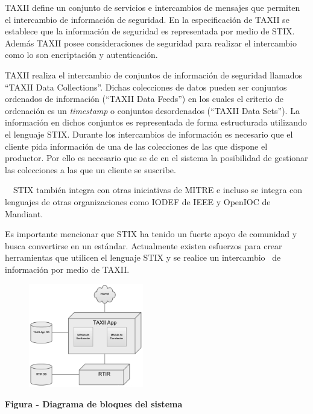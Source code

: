 {
	TAXII define un conjunto de servicios e intercambios de mensajes que permiten el intercambio de información de
	seguridad. En la especificación de TAXII se establece que la información de seguridad es representada por medio de
	STIX. Además TAXII posee consideraciones de seguridad para realizar el intercambio como lo son encriptación y
	autenticación. }


\bigskip

{
	TAXII realiza el intercambio de conjuntos de información de seguridad llamados ``TAXII Data Collections''. Dichas
	colecciones de datos pueden ser conjuntos ordenados de información (``TAXII Data Feeds'') en los cuales el criterio de
	ordenación es un \textit{timestamp} o conjuntos desordenados (``TAXII Data Sets''). La información en dichos conjuntos
	es representada de forma estructurada utilizando el lenguaje STIX. Durante los intercambios de información es necesario
	que el cliente pida información de una de las colecciones de las que dispone el productor. Por ello es necesario que se
	de en el sistema la posibilidad de gestionar las colecciones a las que un cliente se suscribe.}


\bigskip

{
	\ \ STIX también integra con otras iniciativas de MITRE e incluso se integra con lenguajes de otras organizaciones como
	IODEF de IEEE y OpenIOC de Mandiant. }


\bigskip

{
	Es importante mencionar que STIX ha tenido un fuerte apoyo de comunidad y busca convertirse en un estándar. Actualmente
	existen esfuerzos para crear herramientas que utilicen el lenguaje STIX y se realice un intercambio \ de información
	por medio de TAXII. }

\begin{figure}
	\centering
	\includegraphics[width=1.9673in,height=1.7811in]{Analisis22-img/Analisis22-img016.png}
\end{figure}
{\centering{}\bfseries
	\foreignlanguage{spanish}{Figura }\foreignlanguage{spanish}{ -
	}\foreignlanguage{spanish}{Diagrama de bloques del sistema}
	\par}



